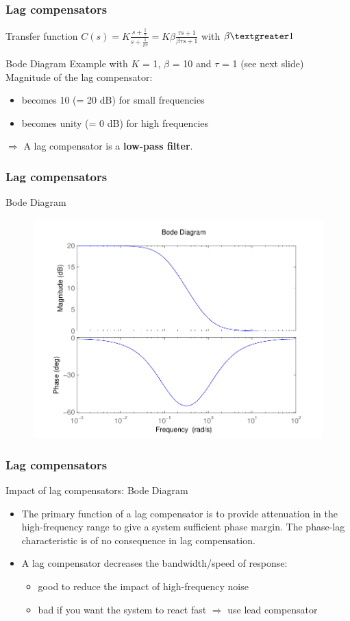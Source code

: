 \begin{frame}
	\frametitle{Lag compensators}
	\begin{block}{Transfer function}
		$C(s) = K\frac{s + \frac{1}{\tau}}{s + \frac{1}{\beta\tau}} = K\beta\frac{\tau s + 1}{\beta \tau s + 1}$ with $\beta  \textgreater  1$
	\end{block}
	\begin{block}{Bode Diagram}
		Example with $K$ = 1, $\beta$ = 10 and $\tau$ = 1 (see next slide) \\ 
		Magnitude of the lag compensator: 
		\begin{itemize}
			\item becomes 10 (= 20 dB) for small frequencies
			\item becomes unity (= 0 dB) for high frequencies
		\end{itemize}
		$\Rightarrow$ A lag compensator is a {\bf low-pass filter}.
		
	\end{block}
\end{frame}

\begin{frame}
\frametitle{Lag compensators}
\begin{block}{Bode Diagram}
	\begin{figure}
		\centering
		\includegraphics[width=0.5
		\linewidth]{bodelagislowpass}
	\end{figure}
\end{block}
\end{frame}

\begin{frame}
	\frametitle{Lag compensators}
	\begin{block}{Impact of lag compensators: Bode Diagram}
	\begin{itemize}
	\item The primary function of a lag compensator is to provide attenuation in the high-frequency
	range to give a system sufficient phase margin. The phase-lag characteristic
	is of no consequence in lag compensation.
	\item A lag compensator decreases the bandwidth/speed of response: 
	\begin{itemize}
		\item good to reduce the impact of high-frequency noise 
		\item bad if you want the system to react fast $\Rightarrow$ use lead compensator
	\end{itemize}
	\end{itemize}
	\end{block}
\end{frame}

